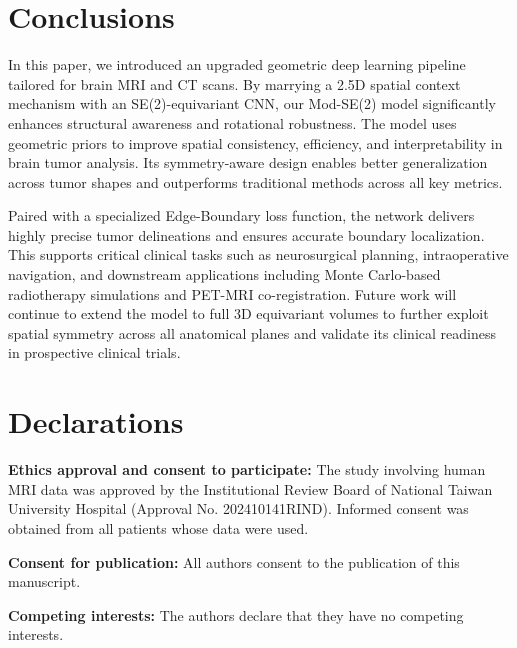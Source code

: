 \section{Conclusions}
In this paper, we introduced an upgraded geometric deep learning pipeline tailored for brain MRI and CT scans. By marrying a 2.5D spatial context mechanism with an SE(2)-equivariant CNN, our Mod-SE(2) model significantly enhances structural awareness and rotational robustness. The model uses geometric priors to improve spatial consistency, efficiency, and interpretability in brain tumor analysis. Its symmetry-aware design enables better generalization across tumor shapes and outperforms traditional methods across all key metrics. 

Paired with a specialized Edge-Boundary loss function, the network delivers highly precise tumor delineations and ensures accurate boundary localization. This supports critical clinical tasks such as neurosurgical planning, intraoperative navigation, and downstream applications including Monte Carlo-based radiotherapy simulations and PET-MRI co-registration. Future work will continue to extend the model to full 3D equivariant volumes to further exploit spatial symmetry across all anatomical planes and validate its clinical readiness in prospective clinical trials.

\section*{Declarations}
\textbf{Ethics approval and consent to participate:} The study involving human MRI data was approved by the Institutional Review Board of National Taiwan University Hospital (Approval No. 202410141RIND). Informed consent was obtained from all patients whose data were used.

\textbf{Consent for publication:} All authors consent to the publication of this manuscript.

\textbf{Competing interests:} The authors declare that they have no competing interests.
